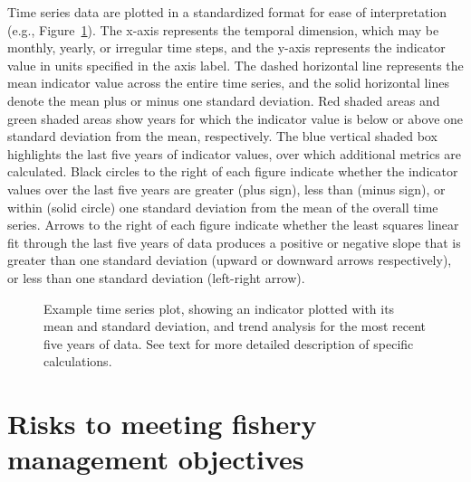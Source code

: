 \documentclass[
  letterpaper,
  oneside,
  open=any]{scrbook}
\begin{document}
Time series data are plotted in a standardized format for ease of
interpretation (e.g., Figure~\ref{fig-explot}). The x-axis represents
the temporal dimension, which may be monthly, yearly, or irregular time
steps, and the y-axis represents the indicator value in units specified
in the axis label. The dashed horizontal line represents the mean
indicator value across the entire time series, and the solid horizontal
lines denote the mean plus or minus one standard deviation. Red shaded
areas and green shaded areas show years for which the indicator value is
below or above one standard deviation from the mean, respectively. The
blue vertical shaded box highlights the last five years of indicator
values, over which additional metrics are calculated. Black circles to
the right of each figure indicate whether the indicator values over the
last five years are greater (plus sign), less than (minus sign), or
within (solid circle) one standard deviation from the mean of the
overall time series. Arrows to the right of each figure indicate whether
the least squares linear fit through the last five years of data
produces a positive or negative slope that is greater than one standard
deviation (upward or downward arrows respectively), or less than one
standard deviation (left-right arrow).

\begin{figure}


\caption{\label{fig-explot}Example time series plot, showing an
indicator plotted with its mean and standard deviation, and trend
analysis for the most recent five years of data. See text for more
detailed description of specific calculations.}

\end{figure}%


\chapter{Risks to meeting fishery management
objectives}\label{risks-to-meeting-fishery-management-objectives}
\end{document}

